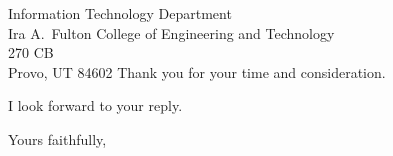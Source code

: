 \documentclass{letter}
\begin{document}
\begin{letter}{Information Technology Department \\ Ira A.\ Fulton College of Engineering and Technology \\ 270 CB \\ Provo, UT 84602}
Thank you for your time and consideration.

I look forward to your reply.

\closing{Yours faithfully,\\
 \\
} 

\end{letter}
\end{document}
